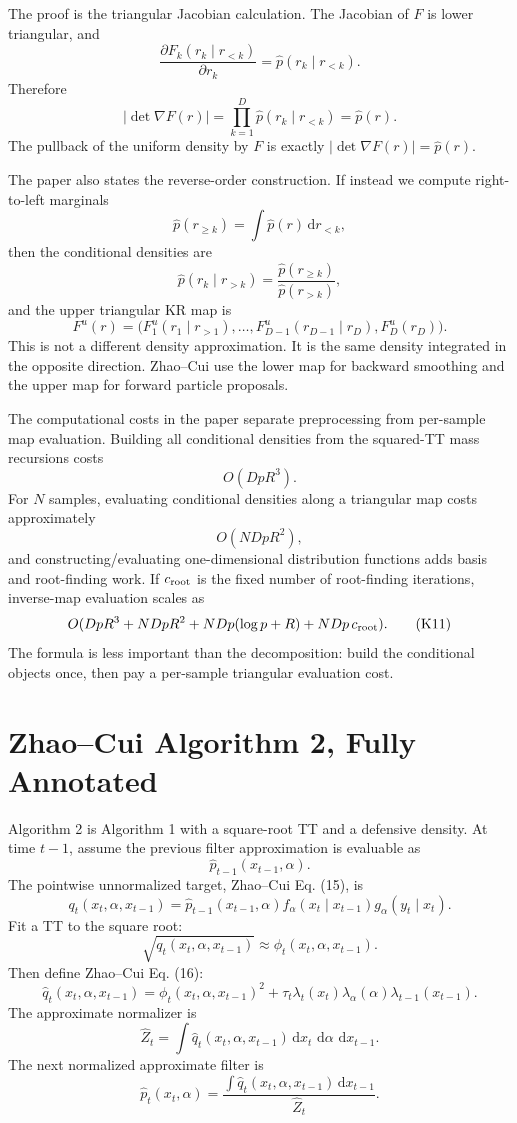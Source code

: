 \documentclass[11pt]{article}
\newcommand{\dd}{\,\mathrm d}
\begin{document}
The proof is the triangular Jacobian calculation.  The Jacobian of \(F\) is
lower triangular, and
\[
    \frac{\partial F_k(r_k\mid r_{<k})}{\partial r_k}
    =
    \widehat p(r_k\mid r_{<k}).
\]
Therefore
\[
    |\det\nabla F(r)|
    =
    \prod_{k=1}^D \widehat p(r_k\mid r_{<k})
    =
    \widehat p(r).
    \tag{K5}
\]
The pullback of the uniform density by \(F\) is exactly
\(|\det\nabla F(r)|=\widehat p(r)\).

The paper also states the reverse-order construction.  If instead we compute
right-to-left marginals
\[
    \widehat p(r_{\ge k})
    =
    \int \widehat p(r)\dd r_{<k},
    \tag{K6}
\]
then the conditional densities are
\[
    \widehat p(r_k\mid r_{>k})
    =
    \frac{\widehat p(r_{\ge k})}{\widehat p(r_{>k})},
    \tag{K7}
\]
and the upper triangular KR map is
\[
    F^u(r)
    =
    \bigl(
    F^u_1(r_1\mid r_{>1}),\ldots,
    F^u_{D-1}(r_{D-1}\mid r_D),F^u_D(r_D)
    \bigr).
    \tag{K8}
\]
This is not a different density approximation.  It is the same density
integrated in the opposite direction.  Zhao--Cui use the lower map for
backward smoothing and the upper map for forward particle proposals.

The computational costs in the paper separate preprocessing from per-sample
map evaluation.  Building all conditional densities from the squared-TT mass
recursions costs
\[
    O(DpR^3).
    \tag{K9}
\]
For \(N\) samples, evaluating conditional densities along a triangular map
costs approximately
\[
    O(NDpR^2),
    \tag{K10}
\]
and constructing/evaluating one-dimensional distribution functions adds basis
and root-finding work.  If \(c_{\rm root}\) is the fixed number of root-finding
iterations, inverse-map evaluation scales as
\[
    O(DpR^3+NDpR^2+NDp(\log p+R)+NDp\,c_{\rm root}).
    \tag{K11}
\]
The formula is less important than the decomposition: build the conditional
objects once, then pay a per-sample triangular evaluation cost.

\section{Zhao--Cui Algorithm 2, Fully Annotated}

Algorithm 2 is Algorithm 1 with a square-root TT and a defensive density.
At time \(t-1\), assume the previous filter approximation is evaluable as
\[
    \widehat p_{t-1}(x_{t-1},\alpha).
\]
The pointwise unnormalized target, Zhao--Cui Eq. (15), is
\[
    q_t(x_t,\alpha,x_{t-1})
    =
    \widehat p_{t-1}(x_{t-1},\alpha)
    f_\alpha(x_t\mid x_{t-1})
    g_\alpha(y_t\mid x_t).
    \tag{A2-1}
\]
Fit a TT to the square root:
\[
    \sqrt{q_t(x_t,\alpha,x_{t-1})}
    \approx
    \phi_t(x_t,\alpha,x_{t-1}).
    \tag{A2-2}
\]
Then define Zhao--Cui Eq. (16):
\[
    \widehat q_t(x_t,\alpha,x_{t-1})
    =
    \phi_t(x_t,\alpha,x_{t-1})^2
    +
    \tau_t\lambda_t(x_t)\lambda_\alpha(\alpha)\lambda_{t-1}(x_{t-1}).
    \tag{A2-3}
\]
The approximate normalizer is
\[
    \widehat Z_t
    =
    \int \widehat q_t(x_t,\alpha,x_{t-1})
    \dd x_t\,\dd\alpha\,\dd x_{t-1}.
    \tag{A2-4}
\]
The next normalized approximate filter is
\[
    \widehat p_t(x_t,\alpha)
    =
    \frac{\int \widehat q_t(x_t,\alpha,x_{t-1})\dd x_{t-1}}
    {\widehat Z_t}.
    \tag{A2-5}
\]
\end{document}
